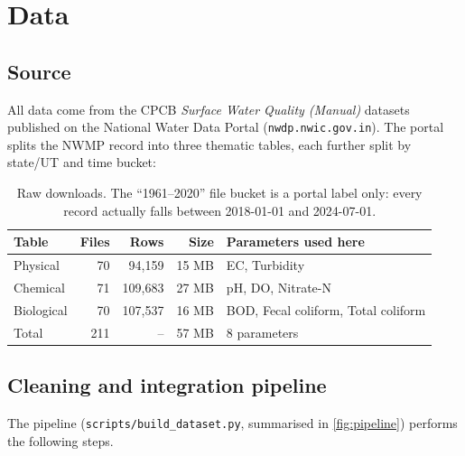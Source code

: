 \section{Data}
\label{sec:data}

\subsection{Source}

All data come from the CPCB \emph{Surface Water Quality (Manual)} datasets published on the National Water Data Portal (\texttt{nwdp.nwic.gov.in}). The portal splits the NWMP record into three thematic tables, each further split by state/UT and time bucket:

\begin{table}[h]
\centering\small
\caption{Raw downloads. The ``1961--2020'' file bucket is a portal label only: every record actually falls between 2018-01-01 and 2024-07-01.}
\label{tab:raw}
\begin{tabular}{lrrrl}
\toprule
Table & Files & Rows & Size & Parameters used here \\
\midrule
Physical   & 70 & 94,159  & 15 MB & EC, Turbidity \\
Chemical   & 71 & 109,683 & 27 MB & pH, DO, Nitrate-N \\
Biological & 70 & 107,537 & 16 MB & BOD, Fecal coliform, Total coliform \\
\midrule
Total      & 211 & -- & 57 MB & 8 parameters \\
\bottomrule
\end{tabular}
\end{table}

\subsection{Cleaning and integration pipeline}

The pipeline (\texttt{scripts/build\_dataset.py}, summarised in \cref{fig:pipeline}) performs the following steps.

